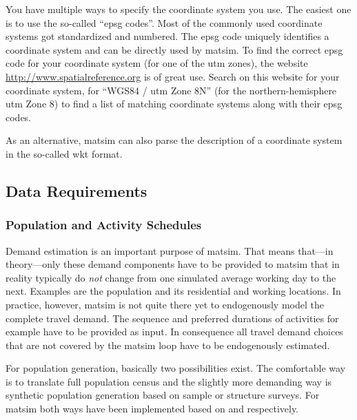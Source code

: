 You have multiple ways to specify the coordinate system you use. The easiest one is to use the so-called ``\gls{epsg} codes''. Most of the commonly used coordinate systems got standardized and numbered. The \gls{epsg} code uniquely identifies a coordinate system and can be directly used by \gls{matsim}. To find the correct \gls{epsg} code for your coordinate system (\eg for one of the \gls{utm} zones), the website \url{http://www.spatialreference.org} is of great use. Search on this website for your coordinate system, \eg for ``WGS84 / \gls{utm} Zone 8N'' (for the northern-hemisphere \gls{utm} Zone 8) to find a list of matching coordinate systems along with their \gls{epsg} codes.

As an alternative, \gls{matsim} can also parse the description of a coordinate system in the so-called \gls{wkt} format. 

\subsection{Data Requirements}
\subsubsection{Population and Activity Schedules}
Demand estimation is 
an important purpose of \gls{matsim}. That means that---in theory---only these demand components have to be provided to \gls{matsim} that in reality typically do \emph{not} change
from one simulated average working day to the next. Examples are the population and its residential and working locations. In practice, however, \gls{matsim} is not quite there yet to endogenously model the complete travel demand. The sequence and preferred durations of activities for example have to be provided as input. In consequence all travel demand choices that are not covered by the \gls{matsim} loop have to be endogenously estimated. 

For population generation, basically two possibilities exist. The comfortable way is to translate full population census and the slightly more demanding way is synthetic population generation \citep[e.g.,][]{GuoBhat_TRR_2007} based on sample or structure surveys. For \gls{matsim} both ways have been implemented based on \citet[][]{BfS_VZ_2000} and \citet[][]{Mueller_unpub_STRC_2011} respectively.

